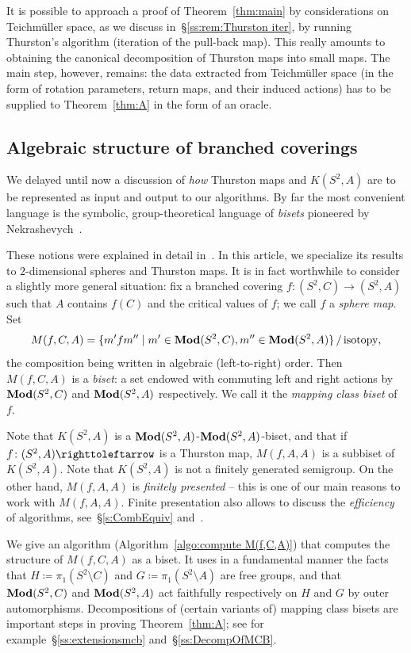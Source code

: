 \documentclass{amsart}
\begin{document}
It is possible to approach a proof of Theorem~\ref{thm:main} by
considerations on Teichm\"uller space, as we discuss
in~\S\ref{ss:rem:Thurston iter}, by running Thurston's algorithm
(iteration of the pull-back map). This really amounts to obtaining the
canonical decomposition of Thurston maps into small maps. The main
step, however, remains: the data extracted from Teichm\"uller space
(in the form of rotation parameters, return maps, and their induced
actions) has to be supplied to Theorem~\ref{thm:A} in the form of an
oracle.

\subsection{Algebraic structure of branched coverings}
We delayed until now a discussion of \emph{how} Thurston maps and
$K(S^2,A)$ are to be represented as input and output to our
algorithms. By far the most convenient language is the symbolic,
group-theoretical language of \emph{bisets} pioneered by
Nekrashevych~\cite{nekrashevych:ssg}.

These notions were explained in detail
in~\cite{bartholdi-dudko:bc1}. In this article, we specialize its
results to $2$-dimensional spheres and Thurston maps.  It is in fact
worthwhile to consider a slightly more general situation: fix a
branched covering $f\colon(S^2,C)\to(S^2,A)$ such that $A$ contains
$f(C)$ and the critical values of $f$; we call $f$ a \emph{sphere
  map}. Set
\begin{equation}\label{eq:intro:m}
  M(f,C,A)=\{m'fm''\mid m'\in\mathbf{\relax Mod}(S^2,C),m''\in\mathbf{\relax Mod}(S^2,A)\}\,/\,\text{isotopy},
\end{equation}
the composition being written in algebraic (left-to-right) order. Then
$M(f,C,A)$ is a \emph{biset}: a set endowed with commuting left and
right actions by $\mathbf{\relax Mod}(S^2,C)$ and $\mathbf{\relax Mod}(S^2,A)$ respectively. We call
it the \emph{mapping class biset} of $f$.

Note that $K(S^2,A)$ is a $\mathbf{\relax Mod}(S^2,A)$-$\mathbf{\relax Mod}(S^2,A)$-biset, and that
if $f\colon(S^2,A)\selfmap$ is a Thurston map, $M(f,A,A)$ is a
subbiset of $K(S^2,A)$.  Note that $K(S^2,A)$ is not a finitely
generated semigroup. On the other hand, $M(f,A,A)$ is \emph{finitely
  presented} -- this is one of our main reasons to work with
$M(f,A,A)$. Finite presentation also allows to discuss the
\emph{efficiency} of algorithms, see~\S\ref{s:CombEquiv}
and~\cite{bartholdi-dudko:bc3}.

We give an algorithm (Algorithm~\ref{algo:compute M(f,C,A)}) that
computes the structure of $M(f,C,A)$ as a biset. It uses in a
fundamental manner the facts that $H\coloneqq\pi_1(S^2\setminus C)$
and $G\coloneqq\pi_1(S^2\setminus A)$ are free groups, and that
$\mathbf{\relax Mod}(S^2,C)$ and $\mathbf{\relax Mod}(S^2,A)$ act faithfully respectively on $H$ and
$G$ by outer automorphisms. Decompositions of (certain variants of)
mapping class bisets are important steps in proving
Theorem~\ref{thm:A}; see for example~\S\ref{ss:extensionsmcb}
and~\S\ref{ss:DecompOfMCB}.
\end{document}
